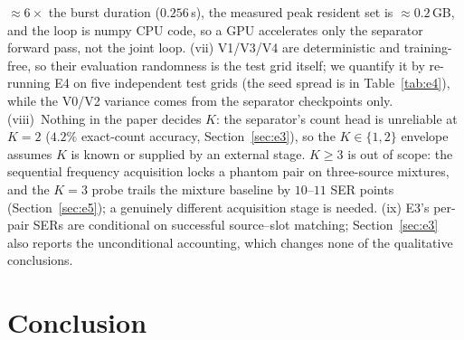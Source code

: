 \documentclass[journal]{IEEEtran}
\begin{document}
$\approx 6\times$ the burst duration ($0.256$\,s), the measured peak
resident set is $\approx 0.2$\,GB, and the loop is
numpy CPU code, so a GPU accelerates only the separator forward pass,
not the joint loop. (vii) V1/V3/V4 are deterministic and
training-free,
so their evaluation randomness is the test grid itself; we quantify
it by re-running E4 on five independent test grids (the seed spread is
in Table~\ref{tab:e4}), while the V0/V2 variance comes from the
separator checkpoints only.
(viii)~Nothing in the paper decides $K$: the separator's
count head is unreliable at $K{=}2$ ($4.2\%$ exact-count accuracy,
Section~\ref{sec:e3}), so the $K \in \{1, 2\}$ envelope assumes $K$
is known or supplied by an external stage. $K \geq 3$ is out of scope: the
sequential frequency acquisition locks a phantom pair on three-source
mixtures, and the $K{=}3$ probe trails the mixture baseline by
$10$--$11$ SER points (Section~\ref{sec:e5}); a genuinely different
acquisition stage is needed. (ix) E3's per-pair SERs are conditional on
successful source--slot matching; Section~\ref{sec:e3} also reports the
unconditional accounting, which changes none of the
qualitative conclusions.

\section{Conclusion}
\label{sec:concl}
\end{document}
